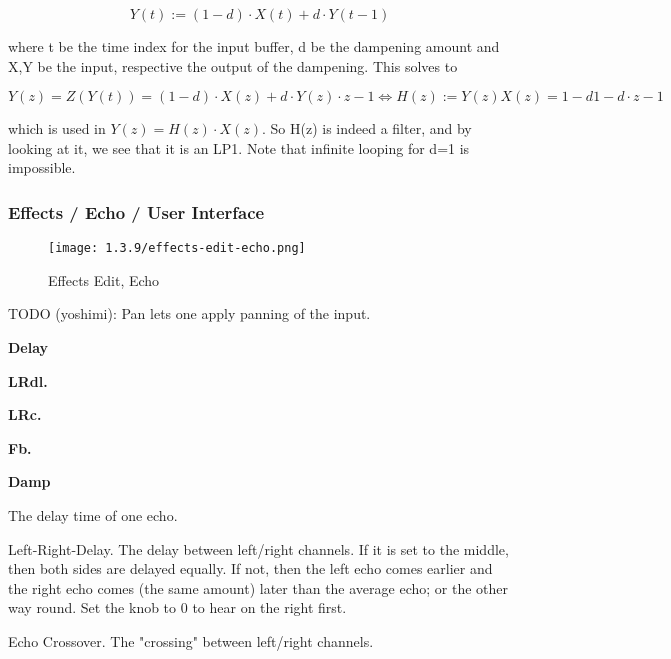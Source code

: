    \[Y(t):=(1-d)⋅X(t)+d⋅Y(t-1)\]

   where t be the time index for the input buffer, d be the dampening amount
   and X,Y be the input, respective the output of the dampening. This solves
   to

   \[Y(z)=Z(Y(t))=(1-d)⋅X(z)+d⋅Y(z)⋅z-1 ⇔ H(z):=Y(z)X(z)=1-d1-d⋅z-1\]

   which is used in \(Y(z)=H(z)⋅X(z)\). So H(z) is indeed a filter, and by
   looking at it, we see that it is an LP1. Note that infinite looping for
   d=1 is impossible.

\subsubsection{Effects / Echo / User Interface}
\label{subsubsec:effects_edit_echo_ui}

\begin{figure}[H]
   \centering 
   \texttt{[image: 1.3.9/effects-edit-echo.png]}
   \caption{Effects Edit, Echo}
   \label{fig:effects_edit_echo}
\end{figure}

   TODO (yoshimi):  Pan lets one apply panning of the input.

   \begin{enumber}
      \item \textbf{Delay}
      \item \textbf{LRdl.}
      \item \textbf{LRc.}
      \item \textbf{Fb.}
      \item \textbf{Damp}
   \end{enumber}

   \setcounter{ItemCounter}{0}      %
 
   The delay time of one echo.

   Left-Right-Delay.
   The delay between left/right channels.
   If it is set to the middle, then both sides are delayed equally. If
   not, then the left echo comes earlier and the right echo comes (the
   same amount) later than the average echo; or the other way round.
   Set the knob to 0 to hear on the right first.

   Echo Crossover.
   The "crossing" between left/right channels.

